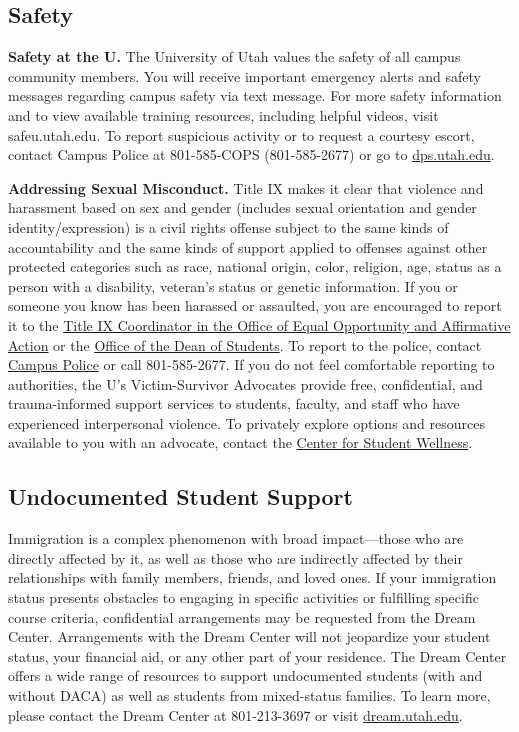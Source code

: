 \documentclass[
  letterpaper,
]{article}
\begin{document}
\subsection{Safety}\label{safety}

\textbf{Safety at the U.} The University of Utah values the safety of
all campus community members. You will receive important emergency
alerts and safety messages regarding campus safety via text message. For
more safety information and to view available training resources,
including helpful videos, visit safeu.utah.edu. To report suspicious
activity or to request a courtesy escort, contact Campus Police at
801-585-COPS (801-585-2677) or go to
\href{https://dps.utah.edu/}{dps.utah.edu}.

\textbf{Addressing Sexual Misconduct.} Title IX makes it clear that
violence and harassment based on sex and gender (includes sexual
orientation and gender identity/expression) is a civil rights offense
subject to the same kinds of accountability and the same kinds of
support applied to offenses against other protected categories such as
race, national origin, color, religion, age, status as a person with a
disability, veteran's status or genetic information. If you or someone
you know has been harassed or assaulted, you are encouraged to report it
to the \href{https://oeo.utah.edu/}{Title IX Coordinator in the Office
of Equal Opportunity and Affirmative Action} or the
\href{https://deanofstudents.utah.edu/}{Office of the Dean of Students}.
To report to the police, contact \href{https://dps.utah.edu/}{Campus
Police} or call 801-585-2677. If you do not feel comfortable reporting
to authorities, the U's Victim-Survivor Advocates provide free,
confidential, and trauma-informed support services to students, faculty,
and staff who have experienced interpersonal violence. To privately
explore options and resources available to you with an advocate, contact
the \href{http://wellness.utah.edu/}{Center for Student Wellness}.

\subsection{Undocumented Student
Support}\label{undocumented-student-support}

Immigration is a complex phenomenon with broad impact---those who are
directly affected by it, as well as those who are indirectly affected by
their relationships with family members, friends, and loved ones. If
your immigration status presents obstacles to engaging in specific
activities or fulfilling specific course criteria, confidential
arrangements may be requested from the Dream Center. Arrangements with
the Dream Center will not jeopardize your student status, your financial
aid, or any other part of your residence. The Dream Center offers a wide
range of resources to support undocumented students (with and without
DACA) as well as students from mixed-status families. To learn more,
please contact the Dream Center at 801-213-3697 or visit
\href{http://dream.utah.edu/}{dream.utah.edu}.
\end{document}
